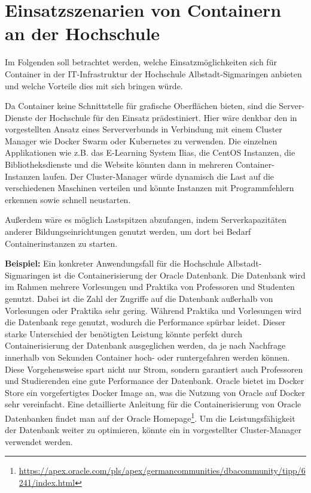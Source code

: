 \section{Einsatzszenarien von Containern an der Hochschule}
\label{sec:HS}
Im Folgenden soll betrachtet werden, welche Einsatzmöglichkeiten sich für Container in der IT-Infrastruktur der Hochschule Albstadt-Sigmaringen anbieten und welche Vorteile dies mit sich bringen würde. 

Da Container keine Schnittstelle für grafische Oberflächen bieten, sind die Server-Dienste der Hochschule für den Einsatz prädestiniert.
Hier wäre denkbar den in  vorgestellten Ansatz eines Serververbunds in Verbindung mit einem Cluster Manager wie Docker Swarm oder Kubernetes zu verwenden.
Die einzelnen Applikationen wie z.B. das E-Learning System Ilias, die CentOS Instanzen, die Bibliotheksdienste und die Website könnten dann in mehreren Container-Instanzen laufen.
Der Cluster-Manager würde dynamisch die Last auf die verschiedenen Maschinen verteilen und könnte Instanzen mit Programmfehlern erkennen sowie schnell neustarten.

Außerdem wäre es möglich Lastspitzen abzufangen, indem Serverkapazitäten anderer Bildungseinrichtungen genutzt werden, um dort bei Bedarf Containerinstanzen zu starten.

\textbf{Beispiel:}\newline
Ein konkreter Anwendungsfall für die Hochschule Albstadt-Sigmaringen ist die Containerisierung der Oracle Datenbank. Die Datenbank wird im Rahmen mehrere Vorlesungen und Praktika von Professoren und Studenten genutzt.
Dabei ist die Zahl der Zugriffe auf die Datenbank außerhalb von Vorlesungen oder Praktika sehr gering.
Während Praktika und Vorlesungen wird die Datenbank rege genutzt, wodurch die Performance spürbar leidet.
Dieser starke Unterschied der benötigten Leistung könnte perfekt durch Containerisierung der Datenbank ausgeglichen werden, da je nach Nachfrage innerhalb von Sekunden Container hoch- oder runtergefahren werden können.
Diese Vorgehensweise spart nicht nur Strom, sondern garantiert auch Professoren und Studierenden eine gute Performance der Datenbank. Oracle bietet im Docker Store ein vorgefertigtes Docker Image an, was die Nutzung von Oracle auf Docker sehr vereinfacht.
Eine detaillierte Anleitung für die Containerisierung von Oracle Datenbanken findet man auf der Oracle Homepage\footnote{\url{https://apex.oracle.com/pls/apex/germancommunities/dbacommunity/tipp/6241/index.html}}.
Um die Leistungsfähigkeit der Datenbank weiter zu optimieren, könnte ein in  vorgestellter Cluster-Manager verwendet werden.
